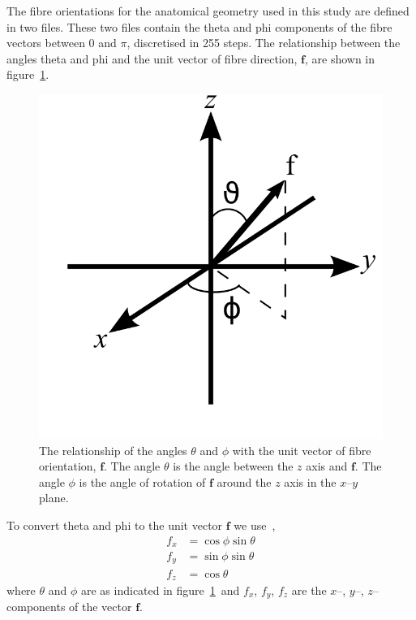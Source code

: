 The fibre orientations for the anatomical geometry used in this study are
defined in two files.
These two files contain the theta and phi components of the fibre vectors
between $0$ and $\pi$, discretised in 255 steps.
The relationship between the angles theta and phi and the unit vector of fibre
direction, $\mathbf{f}$, are shown in
figure~\ref{fig:atrium:structure:unit_vector}.
\begin{figure}
\begin{center}
\includegraphics{figures/atrium/structure/unit_vector}
\end{center}
\caption[Relationship of $\theta$, $\phi$ and $\mathbf{f}$]{
\label{fig:atrium:structure:unit_vector}
The relationship of the angles $\theta$ and $\phi$ with the unit vector of fibre
orientation, $\mathbf{f}$.
The angle $\theta$ is the angle between the $z$ axis and $\mathbf{f}$.
The angle $\phi$ is the angle of rotation of $\mathbf{f}$ around the $z$ axis in
the $x\text{--}y$ plane.
}
\end{figure}
To convert theta and phi to the unit vector $\mathbf{f}$ we
use~\cite{Misner1973},
\begin{subequations}\label{eqn:atrium:structure:anglestof}
\begin{align}
f_x &= \cos\phi \sin\theta \label{eqn:atrium:structure:anglestofx}\\
f_y &= \sin\phi \sin\theta\label{eqn:atrium:structure:anglestofy}\\
f_z &= \cos\theta\label{eqn:atrium:structure:anglestofz}
\end{align}
\end{subequations}
where $\theta$ and $\phi$ are as indicated in
figure~\ref{fig:atrium:structure:unit_vector}\ and $f_x$, $f_y$, $f_z$ are the
$x$--, $y$--, $z$-- components of the vector $\mathbf{f}$.





